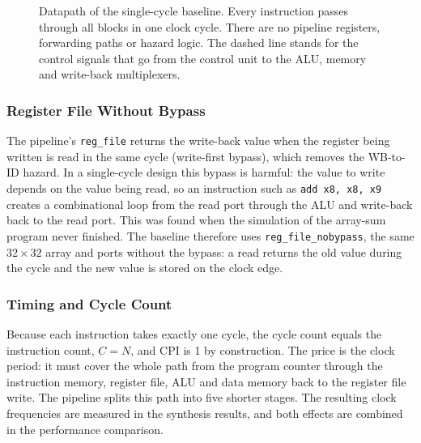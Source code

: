 \begin{figure}[!t]
\caption{Datapath of the single-cycle baseline. Every instruction passes through
all blocks in one clock cycle. There are no pipeline registers, forwarding paths
or hazard logic. The dashed line stands for the control signals that go from
the control unit to the ALU, memory and write-back multiplexers.}
\label{fig:single}
\end{figure}

\subsubsection{Register File Without Bypass}
The pipeline's \texttt{reg\_file} returns the write-back value when the register
being written is read in the same cycle (write-first bypass), which removes the
WB-to-ID hazard. In a single-cycle design this bypass is harmful: the value to
write depends on the value being read, so an instruction such as
\texttt{add x8, x8, x9} creates a combinational loop from the read port through
the ALU and write-back back to the read port. This was found when the
simulation of the array-sum program never finished. The baseline therefore uses
\texttt{reg\_file\_nobypass}, the same $32\times32$ array and ports without the
bypass: a read returns the old value during the cycle and the new value is
stored on the clock edge.

\subsubsection{Timing and Cycle Count}
Because each instruction takes exactly one cycle, the cycle count equals the
instruction count, $C = N$, and CPI is 1 by construction. The price is the
clock period: it must cover the whole path from the program counter through the
instruction memory, register file, ALU and data memory back to the register
file write. The pipeline splits this path into five shorter stages. The
resulting clock frequencies are measured in the synthesis results, and both
effects are combined in the performance comparison.


